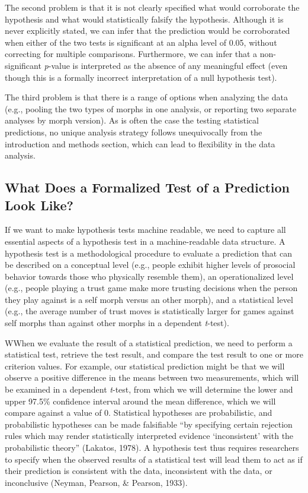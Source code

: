 \documentclass[
  english,
  doc,floatsintext]{apa6}
\begin{document}
The second problem is that it is not clearly specified what would corroborate the hypothesis and what would statistically falsify the hypothesis. Although it is never explicitly stated, we can infer that the prediction would be corroborated when either of the two tests is significant at an alpha level of 0.05, without correcting for multiple comparisons. Furthermore, we can infer that a non-significant \emph{p}-value is interpreted as the absence of any meaningful effect (even though this is a formally incorrect interpretation of a null hypothesis test).

The third problem is that there is a range of options when analyzing the data (e.g., pooling the two types of morphs in one analysis, or reporting two separate analyses by morph version). As is often the case the testing statistical predictions, no unique analysis strategy follows unequivocally from the introduction and methods section, which can lead to flexibility in the data analysis.

\hypertarget{what-does-a-formalized-test-of-a-prediction-look-like}{%
\subsection{What Does a Formalized Test of a Prediction Look Like?}\label{what-does-a-formalized-test-of-a-prediction-look-like}}

If we want to make hypothesis tests machine readable, we need to capture all essential aspects of a hypothesis test in a machine-readable data structure. A hypothesis test is a methodological procedure to evaluate a prediction that can be described on a conceptual level (e.g., people exhibit higher levels of prosocial behavior towards those who physically resemble them), an operationalized level (e.g., people playing a trust game make more trusting decisions when the person they play against is a self morph versus an other morph), and a statistical level (e.g., the average number of trust moves is statistically larger for games against self morphs than against other morphs in a dependent \emph{t}-test).

WWhen we evaluate the result of a statistical prediction, we need to perform a statistical test, retrieve the test result, and compare the test result to one or more criterion values. For example, our statistical prediction might be that we will observe a positive difference in the means between two measurements, which will be examined in a dependent \emph{t}-test, from which we will determine the lower and upper 97.5\% confidence interval around the mean difference, which we will compare against a value of 0. Statistical hypotheses are probabilistic, and probabilistic hypotheses can be made falsifiable \enquote{by specifying certain rejection rules which may render statistically interpreted evidence \enquote{inconsistent} with the probabilistic theory} (Lakatos, 1978). A hypothesis test thus requires researchers to specify when the observed results of a statistical test will lead them to act as if their prediction is consistent with the data, inconsistent with the data, or inconclusive (Neyman, Pearson, \& Pearson, 1933).
\end{document}
